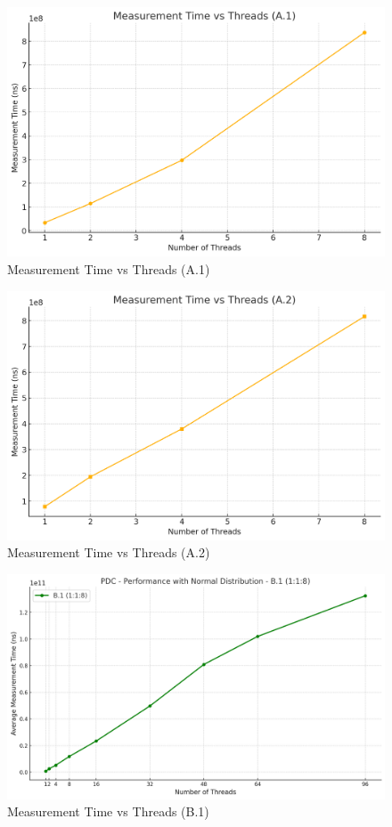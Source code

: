 \documentclass{article}
\begin{document}
\begin{figure}[H]
    \centering
    \includegraphics[width=\textwidth]{LaTex/images/Lab 3 2.3.2.1.png}
    \caption{Measurement Time vs Threads (A.1)}
    \label{fig:enter-label}
\end{figure}

\begin{figure}[H]
    \centering
    \includegraphics[width=\textwidth]{LaTex/images/Lab 3 2.3.2.2.png}
    \caption{Measurement Time vs Threads (A.2)}
    \label{fig:enter-label}
\end{figure}

\begin{figure}[H]
    \centering
    \includegraphics[width=\textwidth]{LaTex/images/Lab 3 2.3.2.3.png}
    \caption{Measurement Time vs Threads (B.1)}
    \label{fig:enter-label}
\end{figure}
\end{document}
